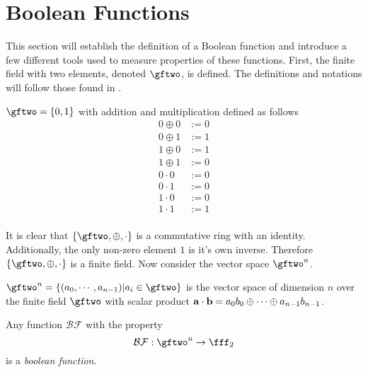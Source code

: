 \section{Boolean Functions}
\par This section will establish the definition of a Boolean function and introduce
a few different tools used to measure properties of these functions. First, the
finite field with two elements, denoted $\gftwo$, is defined. The definitions and
notations will follow those found in \cite{cs_crypto-boolean-functions}.

\begin{definition}
\label{def:GF(2)}
	$\gftwo = \{0,1\}$ with addition and multiplication defined as follows
	\begin{align*}
		0\oplus0&:=0\\
		0\oplus1&:=1\\
		1\oplus0&:=1\\
		1\oplus1&:=0\\
		0\cdot0&:=0\\
		0\cdot1&:=0\\
		1\cdot0&:=0\\
		1\cdot1&:=1\\
	\end{align*}
\end{definition}

\par It is clear that $\{\gftwo,\oplus,\cdot\}$ is a commutative ring with an identity.
Additionally, the only non-zero element $1$ is it's own inverse. Therefore $\{\gftwo,\oplus,\cdot\}$
is a finite field. Now consider the vector space $\gftwo^n$.

\begin{definition}
\label{def:GF(2)^n}
$\gftwo^n = \{(a_0,\cdots,a_{n-1}) | a_i \in \gftwo\}$ is the vector space of dimension $n$
over the finite field $\gftwo$ with scalar product
${\bf a}\cdot{\bf b} = a_0b_0\oplus\cdots\oplus a_{n-1}b_{n-1}$.
\end{definition}




\begin{definition}
\label{def:boolean-function}
  Any function $\mathcal{BF}$ with the property
  \begin{equation}
    \mathcal{BF}:\gftwo^n\rightarrow\fff_2
  \end{equation}
  is a {\em boolean function}.
\end{definition}

